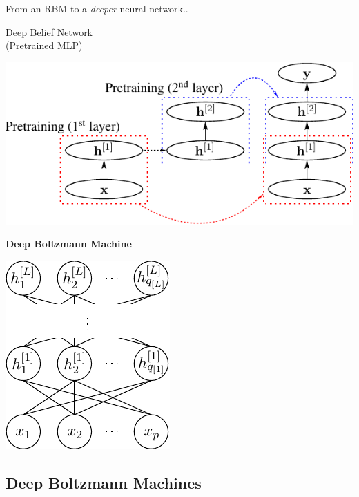 \documentclass{beamer}
\begin{document}
\begin{frame}{From an RBM to a \emph{deeper} neural
network..}

\begin{minipage}{0.4\textwidth}
\centering
Deep Belief Network
\\
{ \small
    (Pretrained MLP)
}
\end{minipage}
\begin{minipage}{0.59\textwidth}
\centering
\includegraphics[width=0.9\columnwidth]{mlp_pretrain.pdf}
\end{minipage}

\vfill
\hrulefill
\vfill

\begin{minipage}{0.4\textwidth}
\centering
{\bf
Deep Boltzmann Machine
}
\end{minipage}
\begin{minipage}{0.59\textwidth}
\centering
\includegraphics[width=0.4\columnwidth]{dbm.pdf}
\end{minipage}

 


\end{frame}

\subsection{Deep Boltzmann Machines}
\end{document}
